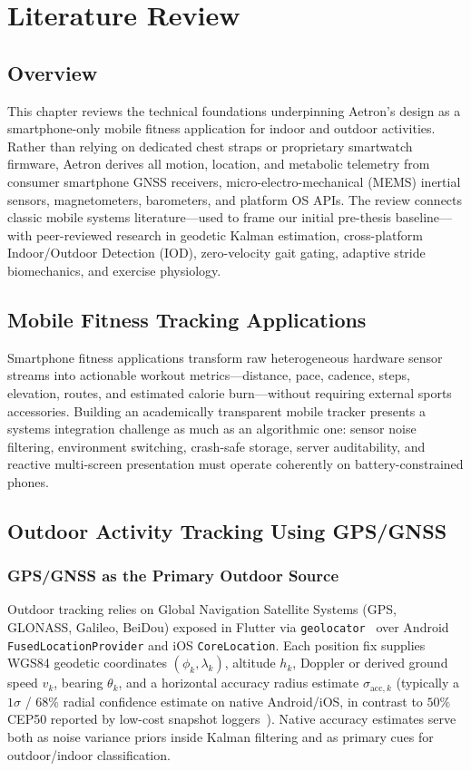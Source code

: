 \chapter{Literature Review}
\label{ch:literature_review}

\section{Overview}
This chapter reviews the technical foundations underpinning Aetron's design as a smartphone-only mobile fitness application for indoor and outdoor activities. Rather than relying on dedicated chest straps or proprietary smartwatch firmware, Aetron derives all motion, location, and metabolic telemetry from consumer smartphone GNSS receivers, micro-electro-mechanical (MEMS) inertial sensors, magnetometers, barometers, and platform OS APIs. The review connects classic mobile systems literature---used to frame our initial pre-thesis baseline---with peer-reviewed research in geodetic Kalman estimation, cross-platform Indoor/Outdoor Detection (IOD), zero-velocity gait gating, adaptive stride biomechanics, and exercise physiology.

\section{Mobile Fitness Tracking Applications}
Smartphone fitness applications transform raw heterogeneous hardware sensor streams into actionable workout metrics---distance, pace, cadence, steps, elevation, routes, and estimated calorie burn---without requiring external sports accessories. Building an academically transparent mobile tracker presents a systems integration challenge as much as an algorithmic one: sensor noise filtering, environment switching, crash-safe storage, server auditability, and reactive multi-screen presentation must operate coherently on battery-constrained phones.

\section{Outdoor Activity Tracking Using GPS/GNSS}
\label{sec:gnss_kinematics}

\subsection{GPS/GNSS as the Primary Outdoor Source}
Outdoor tracking relies on Global Navigation Satellite Systems (GPS, GLONASS, Galileo, BeiDou) exposed in Flutter via \texttt{geolocator}~\cite{geolocator2024} over Android \texttt{FusedLocationProvider} and iOS \texttt{CoreLocation}. Each position fix supplies WGS84 geodetic coordinates $(\phi_k, \lambda_k)$, altitude $h_k$, Doppler or derived ground speed $v_k$, bearing $\theta_k$, and a horizontal accuracy radius estimate $\sigma_{\text{acc}, k}$ (typically a $1\sigma$ / $68\%$ radial confidence estimate on native Android/iOS, in contrast to $50\%$ CEP50 reported by low-cost snapshot loggers~\cite{beuchert2023snappergps}). Native accuracy estimates serve both as noise variance priors inside Kalman filtering and as primary cues for outdoor/indoor classification.

